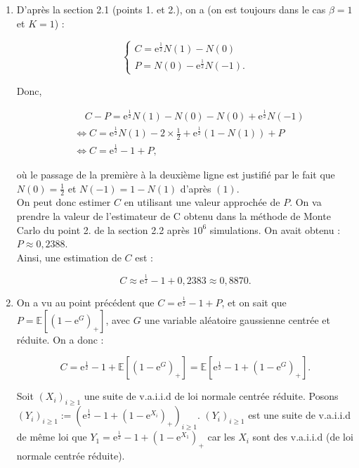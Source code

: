 \documentclass{article}
\theoremstyle{exostyle}
\newenvironment{questions}{
\begin{enumerate}[\hspace{12pt} 1.]}{\end{enumerate}}
\begin{document}
\begin{questions}

\bigbreak

\item  D'après la section 2.1 (points 1. et 2.), on a (on est toujours dans le cas $\beta=1$ et $K=1$) :

\[\left\{
  \begin{array}{lll}
    C = \text{e}^{\frac{1}{2}}N(1)-N(0)\\
    P = N(0) - \text{e}^{\frac{1}{2}}N(-1).
\end{array}
\right.\]

Donc,

\begin{align*}
    & \ \ \ \ \ C - P = \text{e}^{\frac{1}{2}}N(1)-N(0) - N(0) + \text{e}^{\frac{1}{2}}N(-1)\\
    &\Leftrightarrow C = \text{e}^{\frac{1}{2}}N(1) - 2 \times \frac{1}{2} + \text{e}^{\frac{1}{2}}\left(1-N(1)\right)+P\\
    &\Leftrightarrow C = \text{e}^{\frac{1}{2}} - 1 + P,
\end{align*}

où le passage de la première à la deuxième ligne est justifié par le fait que $N(0) = \frac{1}{2}$ et $N(-1) = 1 - N(1)$ d'après $(1)$.\\

On peut donc estimer $C$ en utilisant une valeur approchée de $P$. On va prendre la valeur de l'estimateur de C obtenu dans la méthode de Monte Carlo du point 2. de la section 2.2 après $10^{6}$ simulations. On avait obtenu : $P \approx 0,2388$.\\

Ainsi, une estimation de $C$ est : 

\[C \approx \text{e}^{\frac{1}{2}} - 1 + 0,2383 \approx 0,8870.\]

\bigbreak
\bigbreak


\item On a vu au point précédent que $C = \text{e}^{\frac{1}{2}} - 1 + P$, et on sait que $P = \mathbb{E} \left[ \left( 1 - \text{e}^{G} \right)_{+} \right]$, avec $G$ une variable aléatoire gaussienne centrée et réduite. On a donc : 

\[C = \text{e}^{\frac{1}{2}} - 1 + \mathbb{E} \left[ \left( 1 - \text{e}^{G} \right)_{+} \right] = \mathbb{E} \left[ \text{e}^{\frac{1}{2}} - 1 + \left( 1 - \text{e}^{G} \right)_{+} \right].\]

Soit $(X_{i})_{i \geq 1}$ une suite de v.a.i.i.d de loi normale centrée réduite. Posons $(Y_{i})_{i \geq 1} := \left( \text{e}^{\frac{1}{2}} - 1 + \left(1-\text{e}^{X_{i}}\right)_{+}\right)_{i \geq 1}$.
$(Y_{i})_{i \geq 1}$ est une suite de v.a.i.i.d de même loi que $Y_{1} = \text{e}^{\frac{1}{2}} - 1 + \left( 1-\text{e}^{X_{1}} \right)_{+}$ car les $X_{i}$ sont des v.a.i.i.d (de loi normale centrée réduite).\\
\\


\end{questions}
\end{document}
